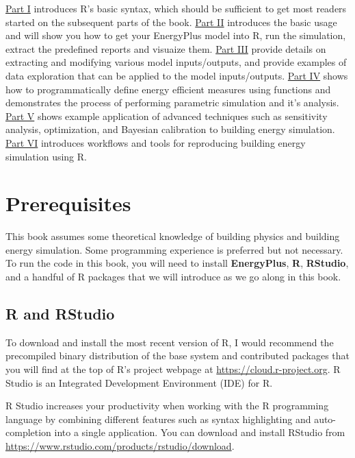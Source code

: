 \documentclass[
]{book}
\begin{document}
\protect\hyperlink{r-basics}{Part I} introduces R's basic syntax, which should be sufficient to get most readers started on the subsequent parts of the book. \protect\hyperlink{get-started}{Part II} introduces the basic usage and will show you how to get your EnergyPlus model into R, run the simulation, extract the predefined reports and visuaize them. \protect\hyperlink{input-output}{Part III} provide details on extracting and modifying various model inputs/outputs, and provide examples of data exploration that can be applied to the model inputs/outputs. \protect\hyperlink{program}{Part IV} shows how to programmatically define energy efficient measures using functions and demonstrates the process of performing parametric simulation and it's analysis. \protect\hyperlink{advanced}{Part V} shows example application of advanced techniques such as sensitivity analysis, optimization, and Bayesian calibration to building energy simulation. \protect\hyperlink{reproduce}{Part VI} introduces workflows and tools for reproducing building energy simulation using R.

\hypertarget{prerequisites}{%
\section*{Prerequisites}\label{prerequisites}}

This book assumes some theoretical knowledge of building physics and building energy simulation. Some programming experience is preferred but not necessary. To run the code in this book, you will need to install \textbf{EnergyPlus}, \textbf{R}, \textbf{RStudio}, and a handful of R packages that we will introduce as we go along in this book.

\hypertarget{r-and-rstudio}{%
\subsection*{R and RStudio}\label{r-and-rstudio}}

To download and install the most recent version of R, I would recommend the precompiled binary distribution of the base system and contributed packages that you will find at the top of R's project webpage at \url{https://cloud.r-project.org}. R Studio is an Integrated Development Environment (IDE) for R.

R Studio increases your productivity when working with the R programming language by combining different features such as syntax highlighting and auto-completion into a single application. You can download and install RStudio from \url{https://www.rstudio.com/products/rstudio/download}.
\end{document}
